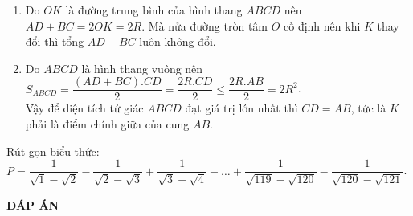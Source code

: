 \begin{ex}
{\begin{enumerate}
		$KB$ chung,\\
		$\widehat{KBH}= \widehat{KBC}$ ( vì cùng bằng $ \widehat{OKB})$.\\
		Suy ra $\bigtriangleup BKH= \bigtriangleup BKC$ ( cạnh huyền, góc nhọn).\\
		Suy ra $KH= KC$. Hay $AB$ tiếp xúc với đường tròn tâm $K$ bán kính $KC=KD$ $(2)$.\\
		Từ $(1)$ và $(2)$, suy ra đường tròn đường kính $CD$ tiếp xúc với ba đường thẳng $AB, AD, BC$.
		\item Do $OK$ là đường trung bình của hình thang $ABCD$ nên $AD+ BC = 2OK= 2R$. Mà nửa đường tròn tâm $O$ cố định nên khi $K$ thay đổi thì tổng $AD+ BC$ luôn không đổi.
		\item Do $ABCD$ là hình thang vuông nên $S_{ABCD} = \dfrac{(AD+BC).CD}{2}= \dfrac{2R.CD}{2} \leq \dfrac{2R.AB}{2}= 2R^2$.\\
		Vậy để diện tích tứ giác $ABCD$ đạt giá trị lớn nhất thì $CD= AB$, tức là $K$ phải là điểm chính giữa của cung $AB$.
			\end{enumerate}
	}
\end{ex}
\begin{ex}%
	Rút gọn biểu thức:\\
	$P= \dfrac{1}{\sqrt{1}- \sqrt{2}}- \dfrac{1}{\sqrt{2}- \sqrt{3}}+ \dfrac{1}{\sqrt{3}- \sqrt{4}}- \ldots + \dfrac{1}{\sqrt{119}- \sqrt{120}}- \dfrac{1}{\sqrt{120}- \sqrt{121}}$.
\end{ex}


\newpage
\begin{center}
	\textbf{ĐÁP ÁN}
\end{center}
\begin{multicols}{10}
	 
\end{multicols}


